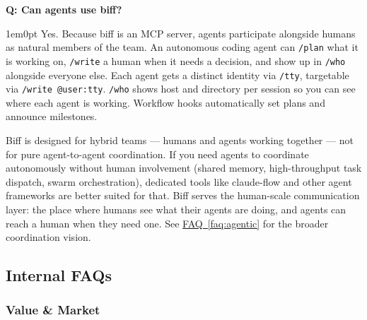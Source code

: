 \documentclass[11pt,letterpaper]{article}
\newcounter{faqnum}
\newenvironment{faqpair}[1]{%
  \needspace{4\baselineskip}%
  \vspace{0.5em}%
  \refstepcounter{faqnum}%
  \noindent\textbf{\color{SectionBlue}Q\thefaqnum: #1}\par\nopagebreak[4]%
  \vspace{0.2em}%
  \begin{adjustwidth}{1em}{0pt}%
  \setlength{\parindent}{0pt}%
}{%
  \end{adjustwidth}%
  \vspace{0.5em}%
}
\newcommand{\faqref}[1]{\hyperref[#1]{FAQ~\ref*{#1}}}
\begin{document}
\begin{faqpair}{Can agents use biff?}\label{faq:agents}
  Yes. Because biff is an MCP server, agents participate alongside humans
  as natural members of the team. An autonomous coding agent can
  \texttt{/plan} what it is working on, \texttt{/write} a human when it
  needs a decision, and show up in \texttt{/who} alongside everyone else.
  Each agent gets a distinct identity via \texttt{/tty}, targetable via
  \texttt{/write @user:tty}. \texttt{/who} shows host and directory per
  session so you can see where each agent is working. Workflow hooks
  automatically set plans and announce milestones.

  Biff is designed for hybrid teams --- humans and agents working together
  --- not for pure agent-to-agent coordination. If you need agents to
  coordinate autonomously without human involvement (shared memory,
  high-throughput task dispatch, swarm orchestration), dedicated tools like
  claude-flow and other agent frameworks are better suited for that. Biff
  serves the human-scale communication layer: the place where humans see
  what their agents are doing, and agents can reach a human when they need
  one. See \faqref{faq:agentic} for the broader coordination vision.
\end{faqpair}


\pagebreak

\subsection*{Internal FAQs}

\subsubsection*{Value \& Market}
\end{document}
